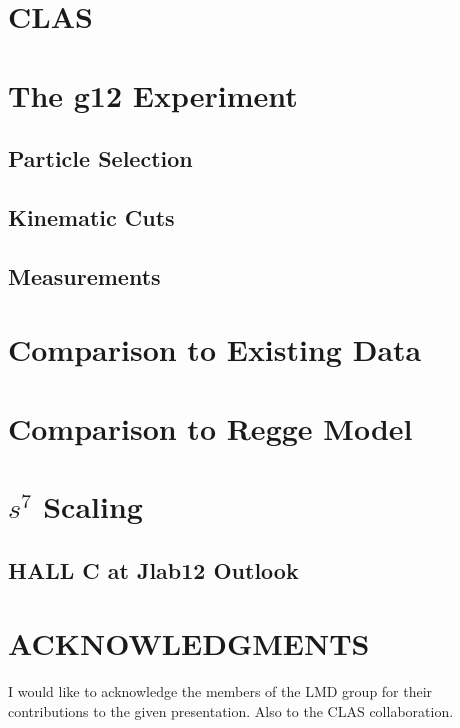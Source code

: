 \documentclass{aip-cp}
\begin{document}
\section{CLAS}
\section{The g12 Experiment}
\subsection{Particle Selection}
\subsection{Kinematic Cuts}
\subsection{Measurements}
\section{Comparison to Existing Data}
\section{Comparison to Regge Model}
\section{$s^7$ Scaling}
\subsection{HALL C at Jlab12 Outlook}
\section{ACKNOWLEDGMENTS}
I would like to acknowledge the members of the LMD group for their contributions to the given presentation. Also to the CLAS collaboration.


\nocite{*}
%
%
\end{document}
